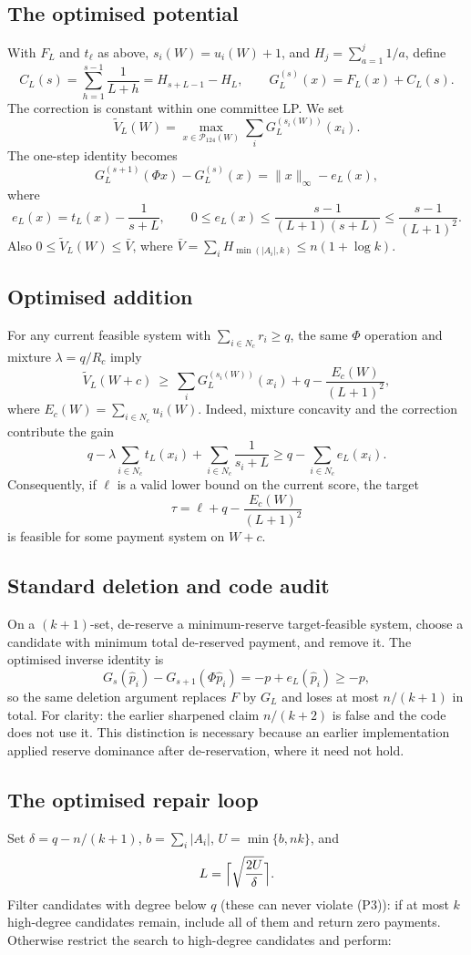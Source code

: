 \documentclass[11pt,a4paper]{article}
\theoremstyle{definition}
\theoremstyle{remark}
\newcommand{\calP}{\mathcal P}
\newcommand{\tV}{\widetilde V}
\newcommand{\barV}{\bar V}
\begin{document}
\subsection{The optimised potential}
With $F_L$ and $t_\ell$ as above, $s_i(W)=u_i(W)+1$, and $H_j=\sum_{a=1}^j1/a$, define
\[
C_L(s)=\sum_{h=1}^{s-1}\frac1{L+h}=H_{s+L-1}-H_L,\qquad
G_L^{(s)}(x)=F_L(x)+C_L(s).
\]
The correction is constant within one committee LP. We set
\[
\tV_L(W)=\max_{x\in\calP_{124}(W)}\sum_iG_L^{(s_i(W))}(x_i).
\]
The one-step identity becomes
\[
G_L^{(s+1)}(\Phi x)-G_L^{(s)}(x)=\|x\|_\infty-e_L(x),
\]
where
\[
e_L(x)=t_L(x)-\frac1{s+L},\qquad
0\le e_L(x)\le\frac{s-1}{(L+1)(s+L)}\le\frac{s-1}{(L+1)^2}.
\]
Also $0\le\tV_L(W)\le\barV$, where $\barV=\sum_iH_{\min(|A_i|,k)}\le n(1+\log k)$.

\subsection{Optimised addition}
For any current feasible system with $\sum_{i\in N_c}r_i\ge q$, the same $\Phi$ operation and mixture $\lambda=q/R_c$ imply
\[
\tV_L(W+c)\ \ge\ \sum_iG_L^{(s_i(W))}(x_i)+q-\frac{E_c(W)}{(L+1)^2},
\]
where $E_c(W)=\sum_{i\in N_c}u_i(W)$. Indeed, mixture concavity and the correction contribute the gain
\[
q-\lambda\sum_{i\in N_c}t_L(x_i)+\sum_{i\in N_c}\frac1{s_i+L}
 \ge q-\sum_{i\in N_c}e_L(x_i).
\]
Consequently, if $\ell$ is a valid lower bound on the current score, the target
\[
\tau=\ell+q-\frac{E_c(W)}{(L+1)^2}
\]
is feasible for some payment system on $W+c$.

\subsection{Standard deletion and code audit}
On a $(k+1)$-set, de-reserve a minimum-reserve target-feasible system, choose a candidate with minimum total de-reserved payment, and remove it. The optimised inverse identity is
\[
G_s(\hat p_i)-G_{s+1}(\Phi\hat p_i)=-p+e_L(\hat p_i)\ge-p,
\]
so the same deletion argument replaces $F$ by $G_L$ and loses at most $n/(k+1)$ in total. For clarity: the earlier sharpened claim $n/(k+2)$ is false and the code does not use it. This distinction is necessary because an earlier implementation applied reserve dominance after de-reservation, where it need not hold.

\subsection{The optimised repair loop}
Set $\delta=q-n/(k+1)$, $b=\sum_i|A_i|$, $U=\min\{b,nk\}$, and
\[
L=\Bigl\lceil\sqrt{\frac{2U}{\delta}}\Bigr\rceil.
\]
Filter candidates with degree below $q$ (these can never violate (P3)):
if at most $k$ high-degree candidates remain, include all of them and return zero payments. Otherwise restrict the search to high-degree candidates and perform:
\end{document}
